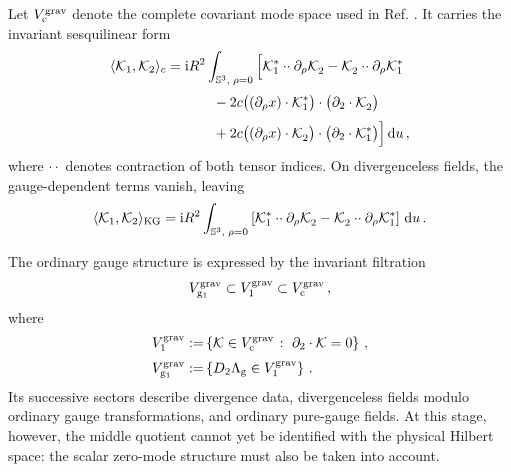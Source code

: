 \documentclass{SciPost}
\begin{document}
Let $V_{\rm c}^{\rm grav}$ denote the complete covariant mode space used in Ref. \cite{GravGB}. It carries the invariant sesquilinear form
\begin{align}
    \langle{\cal K}_1,{\cal K}_2\rangle_c
    ={}&\mathrm{i}R^2
    \int_{\mathbb S^3,\;\rho=0}
    \Big[
        {{\cal K}^\ast_1}\mathbin{\cdot\cdot}
        \partial_\rho{\cal K}^{}_2
        -{\cal K}^{}_2\mathbin{\cdot\cdot}
        \partial_\rho{{\cal K}^\ast_1}
        \nonumber \\[3pt]
        &\qquad
        -2c\bigl((\partial_\rho x)\cdot
        {{\cal K}^\ast_1}\bigr)\cdot
        \bigl(\partial_2\cdot{\cal K}^{}_2\bigr)
        \nonumber \\[3pt]
        &\qquad
        +2c\bigl((\partial_\rho x)\cdot
        {\cal K}^{}_2\bigr)\cdot
        \bigl(\partial_2\cdot{{\cal K}^\ast_1}\bigr)
    \Big]\,\mathrm{d}u \,,
\end{align}
where $\mathbin{\cdot\cdot}$ denotes contraction of both tensor indices. On divergenceless fields, the gauge-dependent terms vanish, leaving
\begin{align}
    \langle{\cal K}_1,{\cal K}_2\rangle_{\rm KG}
    =
    \mathrm{i}R^2
    \int_{\mathbb S^3,\;\rho=0}
    \left[
        {{\cal K}^\ast_1}\mathbin{\cdot\cdot}
        \partial_\rho{\cal K}^{}_2
        -{\cal K}^{}_2\mathbin{\cdot\cdot}
        \partial_\rho{{\cal K}^\ast_1}
    \right]\,\mathrm{d}u \,.
\end{align}

The ordinary gauge structure is expressed by the invariant filtration
\begin{align}\label{eq:graviton-GB1}
    V_{{\rm g}_1}^{\rm grav}
    \subset V_1^{\rm grav}
    \subset V_{\rm c}^{\rm grav} \,,
\end{align}
where
\begin{align}
    V_1^{\rm grav}
    :=&
    \left\{
        {\cal K}\in V_{\rm c}^{\rm grav}
        \;\colon\;
        \partial_2\cdot{\cal K}=0
    \right\} \,,
     \\[3pt]
    V_{{\rm g}_1}^{\rm grav}
    :=&
    \left\{
        D_2\Lambda_{\rm g}\in V_1^{\rm grav}
    \right\} \,.
\end{align}
Its successive sectors describe divergence data, divergenceless fields modulo ordinary gauge transformations, and ordinary pure-gauge fields. At this stage, however, the middle quotient cannot yet be identified with the physical Hilbert space: the scalar zero-mode structure must also be taken into account.
\end{document}
